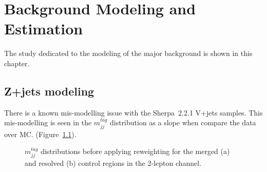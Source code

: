 \chapter{Background Modeling and Estimation}
The study dedicated to the modeling of the major background is shown in this chapter.

\section{Z+jets modeling}
There is a known mis-modelling issue with the Sherpa~2.2.1 V+jets samples. This mis-modelling is seen in the $m^{tag}_{jj}$ distribution as a slope when compare the data over MC. (Figure~\ref{fig:2lep_mtag_before_rw}).

\begin{figure}[ht]
    \centering
    \caption{ $m^{tag}_{jj}$ distributions before applying reweighting for the merged (a) and resolved (b) control regions in the 2-lepton channel.}
    \label{fig:2lep_mtag_before_rw}
\end{figure}

